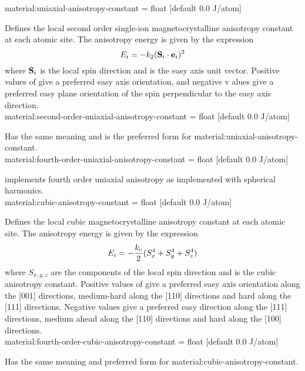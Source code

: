 {\zicf material:uniaxial-anisotropy-constant = float [default 0.0 J/atom]}
  Defines the local second order single-ion magnetocrystalline anisotropy
  constant at each atomic site. The anisotropy energy is given by the expression
\begin{equation*}
E_i = -k_{2} (\mathbf{S}_i \cdot \mathbf{e}_i)^2
\end{equation*}
where $\mathbf{S}_i$ is the local spin direction and \ei is the easy axis unit vector.
Positive values of \kuu give a preferred easy axis orientation, and negative v
alues give a preferred easy plane orientation of the spin perpendicular to the
easy axis direction.\\

{\zicf material:second-order-uniaxial-anisotropy-constant = float [default 0.0 J/atom]}
Has the same meaning and is the preferred form for material:uniaxial-anisotropy-constant.\\

{\zicf material:fourth-order-uniaxial-anisotropy-constant = float [default 0.0 J/atom]}
implements fourth order uniaxial anisotropy as implemented with spherical
harmonics.\\

{\zicf material:cubic-anisotropy-constant = float [default 0.0 J/atom]}
Defines the local cubic magnetocrystalline anisotropy constant at each atomic site. The anisotropy energy is given by the expression
\begin{equation*}
E_i = -\frac{k_{\mathrm{c}}}{2} (S_x^4 + S_y^4 + S_z^4)
\end{equation*}
where $S_{x,y,z}$ are the components of the local spin direction and \kc is
the cubic anisotropy constant. Positive values of \kc give a preferred easy
axis orientation along the [001] directions, medium-hard along the [110]
directions and hard along the [111] directions. Negative values give a preferred
easy direction along the [111] directions, medium ahead along the [110]
directions and hard along the [100] directions. \\

{\zicf material:fourth-order-cubic-anisotropy-constant = float [default 0.0 J/atom]}
Has the same meaning and preferred form for material:cubic-anisotropy-constant.

